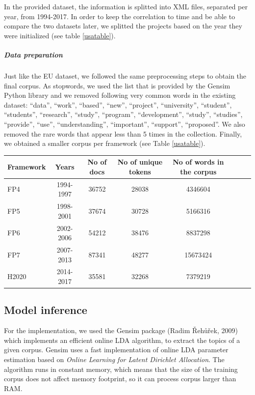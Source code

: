 \documentclass[12pt]{report}
\begin{document}
In the provided dataset, the information is splitted into XML files, separated
per year, from 1994-2017. In order to keep the correlation to time and be able
to compare the two datasets later, we splitted the projects based on the year
they were initialized (see table \ref{usatable}).


\subparagraph{Data preparation}

Just like the EU dataset, we followed the same preprocessing steps to obtain the
final corpus. As stopwords, we used the list that is provided by the Gensim
Python library and we removed following very common words in the existing
dataset: ``data'', ``work'', ``based'', ``new'', ``project'', ``university'', ``student'', ``students'', ``research'', ``study'', ``program'', ``development'', ``study'', ``studies'', ``provide'', ``use'', ``understanding'', ``important'', ``support'', ``proposed''. We also removed the rare words that appear less than 5 
times in the collection. Finally, we obtained a smaller corpus per framework 
(see Table \ref{usatable}).

\begin{center}
\begin{tabular}{l*{6}{c}r}
Framework& Years & No of docs & No of unique tokens & No of words in the corpus \\
\hline
FP4 & 1994-1997 & 36752 & 28038 & 4346604 \\
FP5 & 1998-2001 & 37674 & 30728 & 5166316 \\
FP6 & 2002-2006 & 54212 & 38476 & 8837298 \\
FP7 & 2007-2013 & 87341 & 48277 & 15673424 \\
H2020 & 2014-2017 & 35581 & 32268 & 7379219 \\
\end{tabular}
\label{usatable}
\end{center}

\subsection{Model inference}

For the implementation, we used the Gensim package (Radim Řehůřek,
2009)\cite{rehurek_lrec} which implements an efficient online LDA algorithm, to
extract the topics of a given corpus. Gensim uses a fast implementation of
online LDA parameter estimation based on \emph{Online Learning for Latent Dirichlet
Allocation}.\cite{onlineLDAvb} The algorithm runs in constant memory, which
means that the size of the training corpus does not affect memory footprint, so
it can process corpus larger than RAM.
\end{document}
